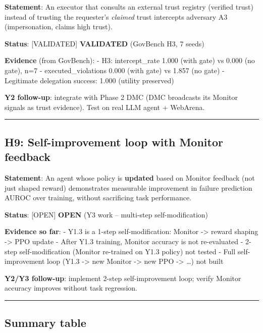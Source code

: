 \documentclass[
]{article}
\begin{document}
\textbf{Statement}: An executor that consults an external trust registry
(verified trust) instead of trusting the requester's \emph{claimed}
trust intercepts adversary A3 (impersonation, claims high trust).

\textbf{Status}: {[}VALIDATED{]} \textbf{VALIDATED} (GovBench H3, 7
seeds)

\textbf{Evidence} (from GovBench): - H3: intercept\_rate 1.000 (with
gate) vs 0.000 (no gate), n=7 - executed\_violations 0.000 (with gate)
vs 1.857 (no gate) - Legitimate delegation success: 1.000 (utility
preserved)

\textbf{Y2 follow-up}: integrate with Phase 2 DMC (DMC broadcasts its
Monitor signals as trust evidence). Test on real LLM agent + WebArena.

\begin{center}\rule{0.5\linewidth}{0.5pt}\end{center}

\subsection{H9: Self-improvement loop with Monitor
feedback}\label{h9-self-improvement-loop-with-monitor-feedback}

\textbf{Statement}: An agent whose policy is \textbf{updated} based on
Monitor feedback (not just shaped reward) demonstrates measurable
improvement in failure prediction AUROC over training, without
sacrificing task performance.

\textbf{Status}: {[}OPEN{]} \textbf{OPEN} (Y3 work -- multi-step
self-modification)

\textbf{Evidence so far}: - Y1.3 is a 1-step self-modification: Monitor
-\textgreater{} reward shaping -\textgreater{} PPO update - After Y1.3
training, Monitor accuracy is not re-evaluated - 2-step
self-modification (Monitor re-trained on Y1.3 policy) not tested - Full
self-improvement loop (Y1.3 -\textgreater{} new Monitor -\textgreater{}
new PPO -\textgreater{} \ldots) not built

\textbf{Y2/Y3 follow-up}: implement 2-step self-improvement loop; verify
Monitor accuracy improves without task regression.

\begin{center}\rule{0.5\linewidth}{0.5pt}\end{center}

\subsection{Summary table}\label{summary-table}
\end{document}
